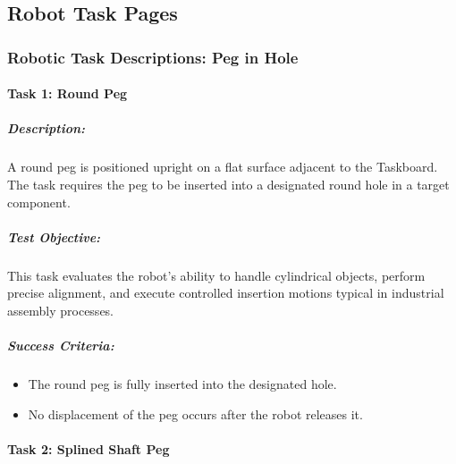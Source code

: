 \documentclass[letterpaper,10pt,english]{sphinxmanual}
\begin{document}
\subsection{Robot Task Pages}
\label{\detokenize{wbk_challenge_robot_tasks_overview:robot-task-pages}}
\sphinxstepscope


\subsubsection{Robotic Task Descriptions: Peg in Hole}
\label{\detokenize{robotic_instructions_peg_in_hole:robotic-task-descriptions-peg-in-hole}}\label{\detokenize{robotic_instructions_peg_in_hole::doc}}

\paragraph{Task 1: Round Peg}
\label{\detokenize{robotic_instructions_peg_in_hole:task-1-round-peg}}

\subparagraph{Description:}
\label{\detokenize{robotic_instructions_peg_in_hole:description}}
\sphinxAtStartPar
A round peg is positioned upright on a flat surface adjacent to the Taskboard.
The task requires the peg to be inserted into a designated round hole in a target component.


\subparagraph{Test Objective:}
\label{\detokenize{robotic_instructions_peg_in_hole:test-objective}}
\sphinxAtStartPar
This task evaluates the robot’s ability to handle cylindrical objects, perform precise alignment,
and execute controlled insertion motions typical in industrial assembly processes.


\subparagraph{Success Criteria:}
\label{\detokenize{robotic_instructions_peg_in_hole:success-criteria}}\begin{itemize}
\item {} 
\sphinxAtStartPar
The round peg is fully inserted into the designated hole.

\item {} 
\sphinxAtStartPar
No  displacement of the peg occurs after the robot releases it.

\end{itemize}


\paragraph{Task 2: Splined Shaft Peg}
\label{\detokenize{robotic_instructions_peg_in_hole:task-2-splined-shaft-peg}}
\end{document}
